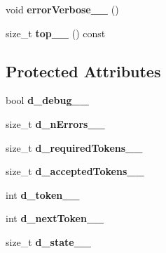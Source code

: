 \begin{DoxyCompactItemize}
\item 
\hypertarget{classParserBase_a7ee84914489b1429632f722208a12033}{void {\bfseries error\+Verbose\+\_\+\+\_\+} ()}\label{classParserBase_a7ee84914489b1429632f722208a12033}

\item 
\hypertarget{classParserBase_a35fbf2a0ff5c900432b427a745cbc712}{size\+\_\+t {\bfseries top\+\_\+\+\_\+} () const }\label{classParserBase_a35fbf2a0ff5c900432b427a745cbc712}

\end{DoxyCompactItemize}
\subsection*{Protected Attributes}
\begin{DoxyCompactItemize}
\item 
\hypertarget{classParserBase_a88284ecf522145ce610a5096fe26749c}{bool {\bfseries d\+\_\+debug\+\_\+\+\_\+}}\label{classParserBase_a88284ecf522145ce610a5096fe26749c}

\item 
\hypertarget{classParserBase_a8e2340de47c0abc43d282a084f831725}{size\+\_\+t {\bfseries d\+\_\+n\+Errors\+\_\+\+\_\+}}\label{classParserBase_a8e2340de47c0abc43d282a084f831725}

\item 
\hypertarget{classParserBase_a26f26893dbd34809ae62f0a4c7069ad4}{size\+\_\+t {\bfseries d\+\_\+required\+Tokens\+\_\+\+\_\+}}\label{classParserBase_a26f26893dbd34809ae62f0a4c7069ad4}

\item 
\hypertarget{classParserBase_a9d975c4ea38bc2b7055473f8f6194277}{size\+\_\+t {\bfseries d\+\_\+accepted\+Tokens\+\_\+\+\_\+}}\label{classParserBase_a9d975c4ea38bc2b7055473f8f6194277}

\item 
\hypertarget{classParserBase_a2402c51729f8f34fede586f8d319dae6}{int {\bfseries d\+\_\+token\+\_\+\+\_\+}}\label{classParserBase_a2402c51729f8f34fede586f8d319dae6}

\item 
\hypertarget{classParserBase_a2be65f718ad04a23b8acd0442b008bfd}{int {\bfseries d\+\_\+next\+Token\+\_\+\+\_\+}}\label{classParserBase_a2be65f718ad04a23b8acd0442b008bfd}

\item 
\hypertarget{classParserBase_a980e638a1405d0f318f48541ad0ada9b}{size\+\_\+t {\bfseries d\+\_\+state\+\_\+\+\_\+}}\label{classParserBase_a980e638a1405d0f318f48541ad0ada9b}


\end{DoxyCompactItemize}
